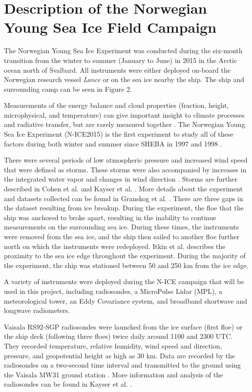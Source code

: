 \chapter{Description of the Norwegian Young Sea Ice Field Campaign}

The Norwegian Young Sea Ice Experiment was conducted during the six-month transition from the winter to summer (January to June) in 2015 in the Arctic ocean north of Svalbard. All instruments were either deployed on-board the Norwegian research vessel \textit{Lance} or on the sea ice nearby the ship. The ship and surrounding camp can be seen in Figure 2.

Measurements of the energy balance and cloud properties (fraction, height, microphysical, and temperature) can give important insight to climate processes and radiative transfer, but are rarely measured together \cite{persson:2002} \cite{schweiger:2004}. The Norwegian Young Sea Ice Experiment (N-ICE2015) is the first experiment to study all of these factors during both winter and summer since SHEBA in 1997 and 1998 \cite{walden:2017}. 

There were several periods of low atmospheric pressure and increased wind speed that were defined as storms. These storms were also accompanied by increases in the integrated water vapor and changes in wind direction \cite{kayser:2017}. Storms are further described in Cohen et al.  \cite{cohen:2017} and Kayser et al. \cite{kayser:2017}. More details about the experiment and datasets collected can be found in Granskog et al. \cite{Granskog:2016dn}. There are three gaps in the dataset resulting from ice breakup. During the experiment, the floe that the ship was anchored to broke apart, resulting in the inability to continue measurements on  the surrounding sea ice. During these times, the instruments were removed from the sea ice, and the ship then sailed to another floe further north on which the instruments were redeployed. Itkin et al. \cite{itkin:2017} describes the proximity to the sea ice edge throughout the experiment. During the majority of the experiment, the ship was stationed between 50 and 250 km from the ice edge. 

A variety of instruments were deployed during the N-ICE campaign that will be used in this project, including  radiosondes, a MicroPulse Lidar (MPL), a meteorological tower, an Eddy Covariance system, and broadband shortwave and longwave radiometers. 

Vaisala RS92-SGP radiosondes were launched from the ice surface (first floe) or the ship deck (following three floes) twice daily around 1100 and 2300 UTC. They recorded temperature, relative humidity, wind speed and direction, pressure, and geopotential height as high as 30 km. Data are recorded by the radiosondes on a two-second time interval and transmitted to the ground using the Vaisala MW31 ground station \cite{kayser:2017} \cite{cohen:2017}. More information and analysis of the radiosondes can be found in Kayser et al. \cite{kayser:2017}.

